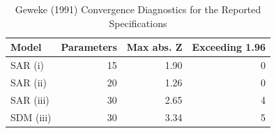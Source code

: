 \begin{table}[ht]
\centering
\begin{tabular}{lrrr}
  \toprule
Model & Parameters & Max abs. Z & Exceeding 1.96 \\ 
  \midrule
SAR (i) &  15 & 1.90 &   0 \\ 
  SAR (ii) &  20 & 1.26 &   0 \\ 
  SAR (iii) &  30 & 2.65 &   4 \\ 
  SDM (iii) &  30 & 3.34 &   5 \\ 
   \bottomrule
\end{tabular}
\caption{Geweke (1991) Convergence Diagnostics for the Reported Specifications} 
\label{tab:geweke}
\end{table}

